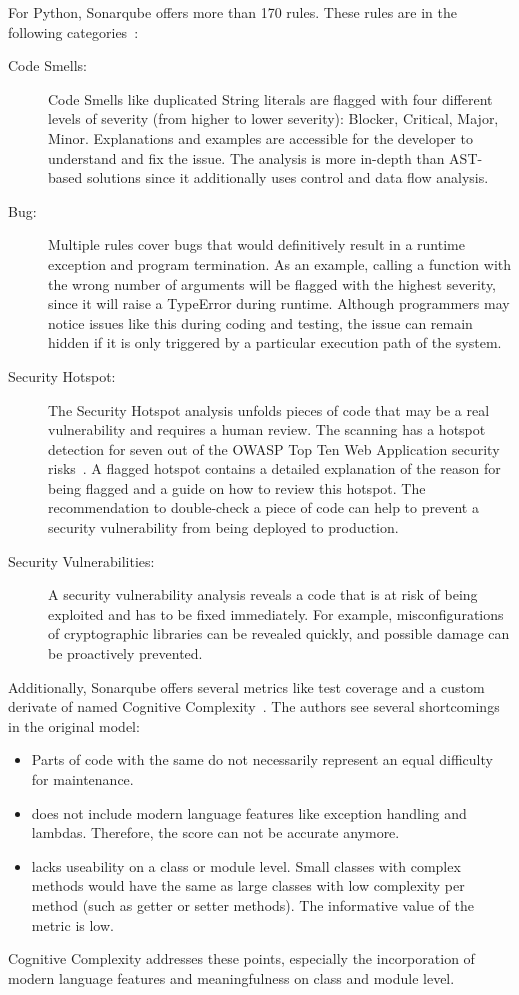For Python, Sonarqube offers more than 170 rules. These rules are in the following categories~\cite{noauthor_python_nodate}:
\begin{description}
    \item[Code Smells:] Code Smells like duplicated String literals are flagged with four different levels of severity (from higher to lower severity): Blocker, Critical, Major, Minor. Explanations and examples are accessible for the developer to understand and fix the issue. The analysis is more in-depth than AST-based solutions since it additionally uses control and data flow analysis.
    \item[Bug:] Multiple rules cover bugs that would definitively result in a runtime exception and program termination. As an example, calling a function with the wrong number of arguments will be flagged with the highest severity, since it will raise a TypeError during runtime. Although programmers may notice issues like this during coding and testing, the issue can remain hidden if it is only triggered by a particular execution path of the system.
     \item[Security Hotspot:] The Security Hotspot analysis unfolds pieces of code that may be a real vulnerability and requires a human review. The scanning has a hotspot detection for seven out of the OWASP Top Ten Web Application security risks~\cite{noauthor_python_nodate}. A flagged hotspot contains a detailed explanation of the reason for being flagged and a guide on how to review this hotspot. The recommendation to double-check a piece of code can help to prevent a security vulnerability from being deployed to production.
    \item[Security Vulnerabilities:]  A security vulnerability analysis reveals a code that is at risk of being exploited and has to be fixed immediately. For example, misconfigurations of cryptographic libraries can be revealed quickly, and possible damage can be proactively prevented.   
\end{description}

Additionally, Sonarqube offers several metrics like test coverage and a custom derivate of  named Cognitive Complexity~\cite{campbell2018cognitive}. The authors see several shortcomings in the original  model:
\begin{itemize}
    \item Parts of code with the same  do not necessarily represent an equal difficulty for maintenance.
    \item  {} does not include modern language features like exception handling and lambdas. Therefore, the score can not be accurate anymore.
    \item {} lacks useability on a class or module level. Small classes with complex methods would have the same  as large classes with low complexity per method (such as getter or setter methods). The informative value of the metric is low.
\end{itemize}
Cognitive Complexity addresses these points, especially the incorporation of modern language features and meaningfulness on class and module level.

